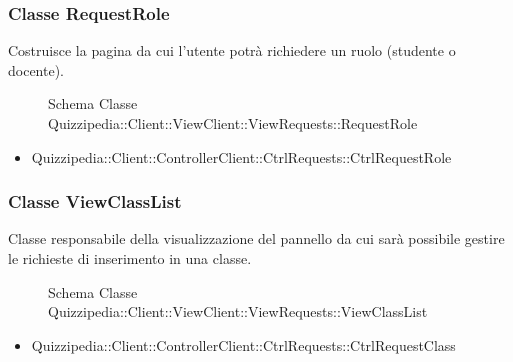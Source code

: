 \subsubsection{Classe RequestRole}
Costruisce la pagina da cui l'utente potrà richiedere un ruolo (studente o docente).
\begin{figure}[H]
\centering
\noindent{}
\caption[Schema Classe RequestRole]{Schema Classe Quizzipedia::Client::ViewClient::ViewRequests::RequestRole}
\end{figure}
\begin{itemize}
\item Quizzipedia::Client::ControllerClient::CtrlRequests::CtrlRequestRole
\end{itemize}
\subsubsection{Classe ViewClassList}
Classe responsabile della visualizzazione del pannello da cui sarà possibile gestire le richieste di inserimento in una classe.
\begin{figure}[H]
\centering
\noindent{}
\caption[Schema Classe ViewClassList]{Schema Classe Quizzipedia::Client::ViewClient::ViewRequests::ViewClassList}
\end{figure}
\begin{itemize}
\item Quizzipedia::Client::ControllerClient::CtrlRequests::CtrlRequestClass
\end{itemize}
